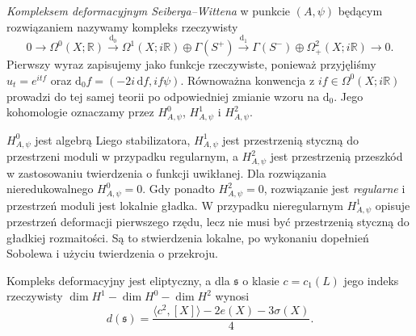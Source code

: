 \begin{definicja}
\emph{Kompleksem deformacyjnym Seiberga--Wittena} w punkcie
$(A,\psi)$ będącym rozwiązaniem nazywamy kompleks rzeczywisty
\[
0\longrightarrow\Omega^0(X;\mathbb R)
\xrightarrow{\mathrm d_0}\Omega^1(X;i\mathbb R)\oplus\Gamma(S^+)
\xrightarrow{\mathrm d_1}\Gamma(S^-)\oplus\Omega^2_+(X;i\mathbb R)
\longrightarrow0.
\]
Pierwszy wyraz zapisujemy jako funkcje rzeczywiste,
ponieważ przyjęliśmy $u_t=e^{itf}$ oraz
$\mathrm d_0f=(-2i\,\mathrm df,if\psi)$.
Równoważna konwencja z $if\in\Omega^0(X;i\mathbb R)$
prowadzi do tej samej teorii po odpowiedniej zmianie wzoru
na $\mathrm d_0$. Jego kohomologie oznaczamy przez
$H^0_{A,\psi}$, $H^1_{A,\psi}$ i $H^2_{A,\psi}$.
\end{definicja}

\begin{uwaga}
$H^0_{A,\psi}$ jest algebrą Liego stabilizatora,
$H^1_{A,\psi}$ jest przestrzenią styczną do przestrzeni
moduli w przypadku regularnym, a $H^2_{A,\psi}$ jest
przestrzenią przeszkód w zastosowaniu twierdzenia o funkcji
uwikłanej. Dla rozwiązania nieredukowalnego
$H^0_{A,\psi}=0$. Gdy ponadto $H^2_{A,\psi}=0$, rozwiązanie
jest \emph{regularne} i przestrzeń moduli jest lokalnie gładka.
W przypadku nieregularnym $H^1_{A,\psi}$ opisuje
przestrzeń deformacji pierwszego rzędu, lecz nie musi być
przestrzenią styczną do gładkiej rozmaitości.
Są to stwierdzenia lokalne, po wykonaniu dopełnień Sobolewa
i użyciu twierdzenia o przekroju.
\end{uwaga}

\begin{twierdzenie}
\label{thm:tg-sw-elliptic}
Kompleks deformacyjny jest eliptyczny, a dla $\mathfrak s$
o klasie $c=c_1(L)$ jego indeks rzeczywisty
$\dim H^1-\dim H^0-\dim H^2$ wynosi
\[
d(\mathfrak s)=\frac{\langle c^2,[X]\rangle-2e(X)-3\sigma(X)}4.
\]
\end{twierdzenie}

